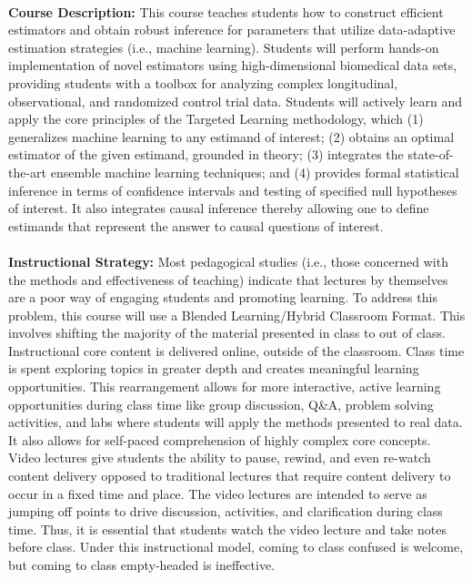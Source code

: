 \documentclass[11pt]{article}
\begin{document}
\textbf {\large \\ Course Description:}
This course teaches students how to construct efficient estimators and obtain
robust inference for parameters that utilize data-adaptive estimation
strategies (i.e., machine learning). Students will perform hands-on
implementation of novel estimators using high-dimensional biomedical data sets,
providing students with a toolbox for analyzing complex longitudinal,
observational, and randomized control trial data. Students will actively learn
and apply the core principles of the Targeted Learning methodology, which (1)
generalizes machine learning to any estimand of interest; (2) obtains an optimal
estimator of the given estimand, grounded in theory; (3) integrates the
state-of-the-art ensemble machine learning techniques; and (4) provides formal
statistical inference in terms of confidence intervals and testing of specified
null hypotheses of interest. It also integrates causal inference thereby
allowing one to define estimands that represent the answer to causal questions
of interest. \\

\textbf {\large \\ Instructional Strategy:}
Most pedagogical studies (i.e., those concerned with the methods and
effectiveness of teaching) indicate that lectures by themselves are a poor way
of engaging students and promoting learning. To address this problem, this
course will use a Blended Learning/Hybrid Classroom Format. This involves
shifting the majority of the material presented in class to out of class.
Instructional core content is delivered online, outside of the classroom. Class
time is spent exploring topics in greater depth and creates meaningful learning
opportunities. This rearrangement allows for more interactive, active learning
opportunities during class time like group discussion, Q\&A, problem solving
activities, and labs where students will apply the methods presented to real
data. It also allows for self-paced comprehension of highly complex core
concepts. Video lectures give students the ability to pause, rewind, and even
re-watch content delivery opposed to traditional lectures that require content
delivery to occur in a fixed time and place. The video lectures are intended to
serve as jumping off points to drive discussion, activities, and clarification
during class time. Thus, it is essential that students watch the video lecture
and take notes before class. Under this instructional model, coming to class
confused is welcome, but coming to class empty-headed is ineffective. \\
\end{document}
